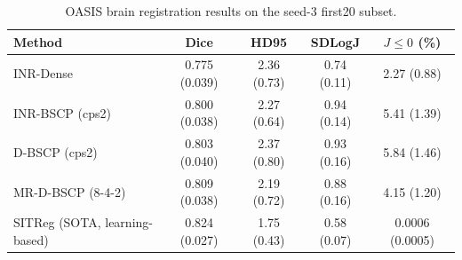 \begin{table}[t]
\centering
\caption{OASIS brain registration results on the seed-3 first20 subset.}
\label{tab:oasis20-publication-main}
\begin{tabular}{lcccc}
\toprule
Method & Dice & HD95 & SDLogJ & $J\leq 0$ (\%) \\
\midrule
INR-Dense & 0.775 (0.039) & 2.36 (0.73) & 0.74 (0.11) & 2.27 (0.88) \\
INR-BSCP (cps2) & 0.800 (0.038) & 2.27 (0.64) & 0.94 (0.14) & 5.41 (1.39) \\
D-BSCP (cps2) & 0.803 (0.040) & 2.37 (0.80) & 0.93 (0.16) & 5.84 (1.46) \\
MR-D-BSCP (8-4-2) & 0.809 (0.038) & 2.19 (0.72) & 0.88 (0.16) & 4.15 (1.20) \\
SITReg (SOTA, learning-based) & 0.824 (0.027) & 1.75 (0.43) & 0.58 (0.07) & 0.0006 (0.0005) \\
\bottomrule
\end{tabular}
\end{table}
